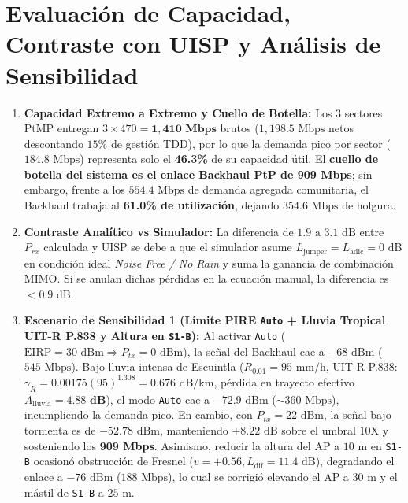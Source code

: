 \documentclass[10pt,letterpaper]{article}
\begin{document}
\section{Evaluación de Capacidad, Contraste con UISP y Análisis de Sensibilidad}

\begin{enumerate}
    \item \textbf{Capacidad Extremo a Extremo y Cuello de Botella:} Los 3 sectores PtMP entregan $3 \times 470 = \mathbf{1,410\text{ Mbps}}$ brutos ($1,198.5\text{ Mbps}$ netos descontando $15\%$ de gestión TDD), por lo que la demanda pico por sector ($184.8\text{ Mbps}$) representa solo el \textbf{46.3\%} de su capacidad útil. El \textbf{cuello de botella del sistema es el enlace Backhaul PtP de 909 Mbps}; sin embargo, frente a los $554.4\text{ Mbps}$ de demanda agregada comunitaria, el Backhaul trabaja al \textbf{61.0\% de utilización}, dejando $354.6\text{ Mbps}$ de holgura.
    \item \textbf{Contraste Analítico vs Simulador:} La diferencia de $1.9\text{ a }3.1\text{ dB}$ entre $P_{rx}$ calculada y UISP se debe a que el simulador asume $L_{\text{jumper}} = L_{\text{adic}} = 0\text{ dB}$ en condición ideal \textit{Noise Free / No Rain} y suma la ganancia de combinación MIMO. Si se anulan dichas pérdidas en la ecuación manual, la diferencia es $<0.9\text{ dB}$.
    \item \textbf{Escenario de Sensibilidad 1 (Límite PIRE \texttt{Auto} + Lluvia Tropical UIT-R P.838 y Altura en \texttt{S1-B}):} Al activar \texttt{Auto} ($\text{EIRP} = 30\text{ dBm} \Rightarrow P_{tx} = 0\text{ dBm}$), la señal del Backhaul cae a $-68\text{ dBm}$ ($545\text{ Mbps}$). Bajo lluvia intensa de Escuintla ($R_{0.01} = 95\text{ mm/h}$, UIT-R P.838: $\gamma_R = 0.00175(95)^{1.308} = 0.676\text{ dB/km}$, pérdida en trayecto efectivo $A_{\text{lluvia}} = \mathbf{4.88\text{ dB}}$), el modo \texttt{Auto} cae a $-72.9\text{ dBm}$ ($\sim 360\text{ Mbps}$), incumpliendo la demanda pico. En cambio, con $P_{tx} = 22\text{ dBm}$, la señal bajo tormenta es de $-52.78\text{ dBm}$, manteniendo $+8.22\text{ dB}$ sobre el umbral $10\text{X}$ y sosteniendo los \textbf{909 Mbps}. Asimismo, reducir la altura del AP a $10\text{ m}$ en \texttt{S1-B} ocasionó obstrucción de Fresnel ($v = +0.56, L_{\text{dif}} = 11.4\text{ dB}$), degradando el enlace a $-76\text{ dBm}$ ($188\text{ Mbps}$), lo cual se corrigió elevando el AP a $30\text{ m}$ y el mástil de \texttt{S1-B} a $25\text{ m}$.

\end{enumerate}
\end{document}

